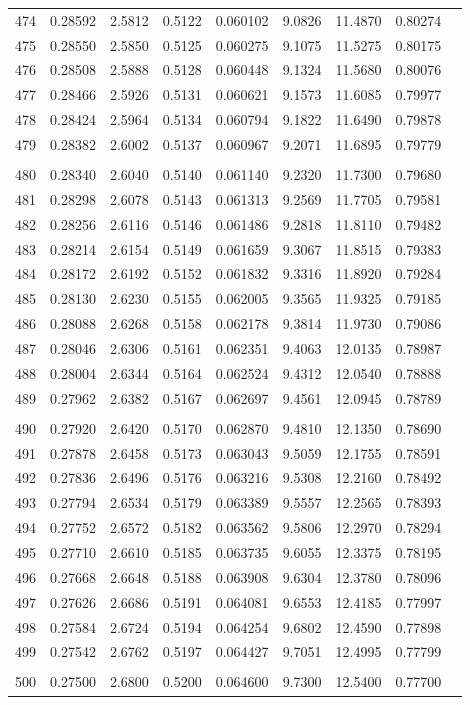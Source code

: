 \documentclass[letter,twosides,10pt]{article}
\begin{document}
\begin{longtable}{|c|c|c|c|c|c|c|c|c|}
474 & 0.28592 & 2.5812 & 0.5122 & 0.060102 & 9.0826 & 11.4870 & 0.80274 \\
475 & 0.28550 & 2.5850 & 0.5125 & 0.060275 & 9.1075 & 11.5275 & 0.80175 \\
476 & 0.28508 & 2.5888 & 0.5128 & 0.060448 & 9.1324 & 11.5680 & 0.80076 \\
477 & 0.28466 & 2.5926 & 0.5131 & 0.060621 & 9.1573 & 11.6085 & 0.79977 \\
478 & 0.28424 & 2.5964 & 0.5134 & 0.060794 & 9.1822 & 11.6490 & 0.79878 \\
479 & 0.28382 & 2.6002 & 0.5137 & 0.060967 & 9.2071 & 11.6895 & 0.79779 \\
 & & & & & & & \\
480 & 0.28340 & 2.6040 & 0.5140 & 0.061140 & 9.2320 & 11.7300 & 0.79680 \\
481 & 0.28298 & 2.6078 & 0.5143 & 0.061313 & 9.2569 & 11.7705 & 0.79581 \\
482 & 0.28256 & 2.6116 & 0.5146 & 0.061486 & 9.2818 & 11.8110 & 0.79482 \\
483 & 0.28214 & 2.6154 & 0.5149 & 0.061659 & 9.3067 & 11.8515 & 0.79383 \\
484 & 0.28172 & 2.6192 & 0.5152 & 0.061832 & 9.3316 & 11.8920 & 0.79284 \\
485 & 0.28130 & 2.6230 & 0.5155 & 0.062005 & 9.3565 & 11.9325 & 0.79185 \\
486 & 0.28088 & 2.6268 & 0.5158 & 0.062178 & 9.3814 & 11.9730 & 0.79086 \\
487 & 0.28046 & 2.6306 & 0.5161 & 0.062351 & 9.4063 & 12.0135 & 0.78987 \\
488 & 0.28004 & 2.6344 & 0.5164 & 0.062524 & 9.4312 & 12.0540 & 0.78888 \\
489 & 0.27962 & 2.6382 & 0.5167 & 0.062697 & 9.4561 & 12.0945 & 0.78789 \\
 & & & & & & & \\
490 & 0.27920 & 2.6420 & 0.5170 & 0.062870 & 9.4810 & 12.1350 & 0.78690 \\
491 & 0.27878 & 2.6458 & 0.5173 & 0.063043 & 9.5059 & 12.1755 & 0.78591 \\
492 & 0.27836 & 2.6496 & 0.5176 & 0.063216 & 9.5308 & 12.2160 & 0.78492 \\
493 & 0.27794 & 2.6534 & 0.5179 & 0.063389 & 9.5557 & 12.2565 & 0.78393 \\
494 & 0.27752 & 2.6572 & 0.5182 & 0.063562 & 9.5806 & 12.2970 & 0.78294 \\
495 & 0.27710 & 2.6610 & 0.5185 & 0.063735 & 9.6055 & 12.3375 & 0.78195 \\
496 & 0.27668 & 2.6648 & 0.5188 & 0.063908 & 9.6304 & 12.3780 & 0.78096 \\
497 & 0.27626 & 2.6686 & 0.5191 & 0.064081 & 9.6553 & 12.4185 & 0.77997 \\
498 & 0.27584 & 2.6724 & 0.5194 & 0.064254 & 9.6802 & 12.4590 & 0.77898 \\
499 & 0.27542 & 2.6762 & 0.5197 & 0.064427 & 9.7051 & 12.4995 & 0.77799 \\
 & & & & & & & \\
500 & 0.27500 & 2.6800 & 0.5200 & 0.064600 & 9.7300 & 12.5400 & 0.77700 \\

\end{longtable}
\end{document}
